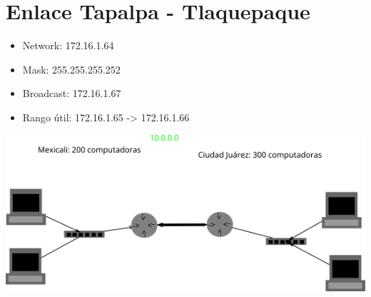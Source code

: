 \documentclass[11pt]{article}
\begin{document}
\section{Enlace Tapalpa - Tlaquepaque}
\label{sec:org09a9927}
\begin{itemize}
\item Network: 172.16.1.64
\item Mask: 255.255.255.252
\item Broadcast: 172.16.1.67
\item Rango útil: 172.16.1.65 -> 172.16.1.66
\end{itemize}




\begin{center}
\includegraphics[width=.9\linewidth]{./ejercicio2.png}
\end{center}
\end{document}
